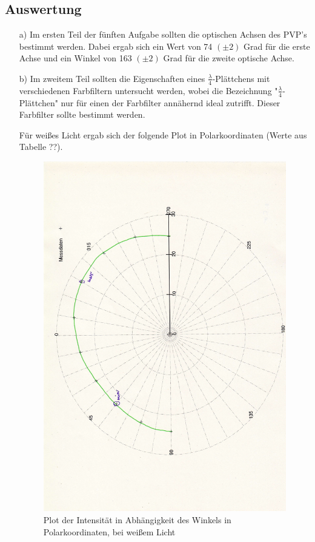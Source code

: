 \documentclass[12pt]{scrartcl}
\begin{document}
\subsection{Auswertung}
\begin{enumerate}
\item[a)]
Im ersten Teil der fünften Aufgabe sollten die optischen Achsen des PVP's bestimmt werden.
Dabei ergab sich ein Wert von 74 $(\pm 2)$ Grad für die erste Achse und ein Winkel von 163 $(\pm 2)$ Grad für die zweite optische Achse.

\item[b)]
Im zweitem Teil sollten die Eigenschaften eines $\frac{\lambda}{4}$-Plättchens mit verschiedenen Farbfiltern untersucht werden, wobei die Bezeichnung "$\frac{\lambda}{4}$-Plättchen" nur für einen der Farbfilter annähernd ideal zutrifft. Dieser Farbfilter sollte bestimmt werden.


Für weißes Licht ergab sich der folgende Plot in Polarkoordinaten (Werte aus Tabelle ??).

\begin{figure}[H]
\centering
    \includegraphics[scale = 0.3, angle = -90]{a_5_w.pdf}
  	\caption[Plot der Intensität in Abhängigkeit des Winkels in Polarkoordinaten, bei weißem Licht]{Plot der Intensität in Abhängigkeit des Winkels in Polarkoordinaten, bei weißem Licht}
  \label{fig:a_5_w}
\end{figure}


\end{enumerate}
\end{document}
